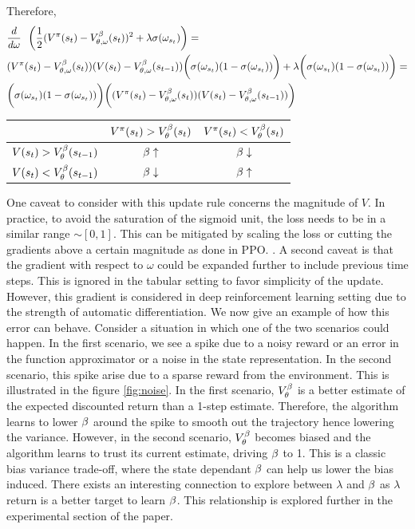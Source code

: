 Therefore, 
\begin{align}
    &\frac{d}{d\omega} \ \ \bigg( \frac{1}{2}(V^{\pi}(s_t) - V^{\beta}_{\theta,\omega}(s_t))^2 + \lambda \sigma(\omega_{s_t}) \bigg) =\\
    &(V^{\pi}(s_t) - V^{\beta}_{\theta,\omega}(s_t)) (V(s_t) - V^{\beta}_{\theta,\omega}(s_{t-1}))\bigg(\sigma(\omega_{s_t})(1 - \sigma(\omega_{s_t}))\bigg)
     + \lambda \bigg(\sigma(\omega_{s_t})(1 - \sigma(\omega_{s_t}))\bigg)  = \\
     &\bigg(\sigma(\omega_{s_t})(1 - \sigma(\omega_{s_t}))\bigg) \bigg((V^{\pi}(s_t) - V^{\beta}_{\theta,\omega}(s_t))(V(s_t) - V^{\beta}_{\theta,\omega}(s_{t-1})) \bigg)
\end{align}
\begin{table}
\begin{center}
\begin{tabular}{ c|c c } 
  & \small{$V^{\pi}(s_t)>V^{\beta}_{\theta}(s_t)$} & \small{$V^{\pi}(s_t)<V^{\beta}_{\theta}(s_t)$} \\ 
   \hline
 \small{$V(s_t)>V^{\beta}_{\theta}(s_{t-1})$} & $\beta \uparrow$ &  $\beta \downarrow$ \\ 
 \small{$V(s_t)<V^{\beta}_{\theta}(s_{t-1})$} & $\beta \downarrow$ & $\beta \uparrow$  \\ 
\end{tabular}
\end{center}
\end{table}
One caveat to consider with this update rule concerns the magnitude of $V$. In practice, to avoid the saturation of the sigmoid unit, the loss needs to be in a similar range $\sim [0,1]$. This can be mitigated by scaling the loss or cutting the gradients above a certain magnitude as done in PPO. \cite{schulman2017proximal}.
A second caveat is that the gradient with respect to $\omega$ could be expanded further to include previous time steps. This is ignored in the tabular setting to favor simplicity of the update. However, this gradient is considered in deep reinforcement learning setting due to the strength of automatic differentiation.
We now give an example of how this error can behave. Consider a situation in which one of the two scenarios could happen. In the first scenario, we see a spike due to a noisy reward or an error in the function approximator or a noise in the state representation. In the second scenario, this spike arise due to a sparse reward from the environment. This is illustrated in the figure \ref{fig:noise}. In the first scenario, $V^{\beta}_{\theta}$ is a better estimate of the expected discounted return than a 1-step estimate. Therefore, the algorithm learns to lower $\beta$ around the spike to smooth out the trajectory hence lowering the variance. However, in the second scenario, $V^{\beta}_{\theta}$ becomes biased and the algorithm learns to trust its current estimate, driving $\beta$ to 1. This is a classic bias variance trade-off, where the state dependant $\beta$ can help us lower the bias induced. There exists an interesting connection to explore between $\lambda$ and $\beta$ as $\lambda$ return is a better target to learn $\beta$. This relationship is explored further in the experimental section of the paper.

